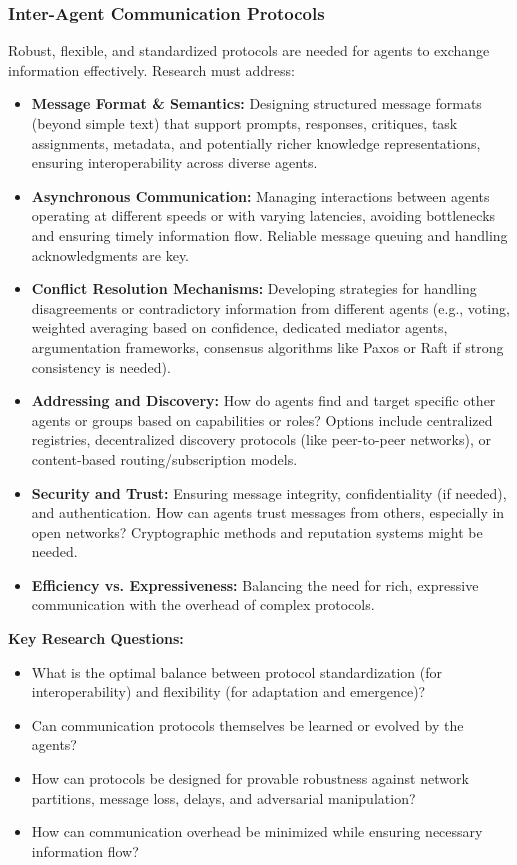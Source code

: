 \documentclass[12pt]{amsart}
\begin{document}
\subsubsection{Inter-Agent Communication Protocols}
\label{subsubsec:protocols}
Robust, flexible, and standardized protocols are needed for agents to exchange information effectively. Research must address:
\begin{itemize}[leftmargin=*]
    \item \textbf{Message Format \& Semantics:} Designing structured message formats (beyond simple text) that support prompts, responses, critiques, task assignments, metadata, and potentially richer knowledge representations, ensuring interoperability across diverse agents.
    \item \textbf{Asynchronous Communication:} Managing interactions between agents operating at different speeds or with varying latencies, avoiding bottlenecks and ensuring timely information flow. Reliable message queuing and handling acknowledgments are key.
    \item \textbf{Conflict Resolution Mechanisms:} Developing strategies for handling disagreements or contradictory information from different agents (e.g., voting, weighted averaging based on confidence, dedicated mediator agents, argumentation frameworks, consensus algorithms like Paxos or Raft if strong consistency is needed).
    \item \textbf{Addressing and Discovery:} How do agents find and target specific other agents or groups based on capabilities or roles? Options include centralized registries, decentralized discovery protocols (like peer-to-peer networks), or content-based routing/subscription models.
    \item \textbf{Security and Trust:} Ensuring message integrity, confidentiality (if needed), and authentication. How can agents trust messages from others, especially in open networks? Cryptographic methods and reputation systems might be needed.
    \item \textbf{Efficiency vs. Expressiveness:} Balancing the need for rich, expressive communication with the overhead of complex protocols.
\end{itemize}
\textbf{Key Research Questions:}
\begin{itemize}[leftmargin=*, label={--}]
    \item What is the optimal balance between protocol standardization (for interoperability) and flexibility (for adaptation and emergence)?
    \item Can communication protocols themselves be learned or evolved by the agents?
    \item How can protocols be designed for provable robustness against network partitions, message loss, delays, and adversarial manipulation?
    \item How can communication overhead be minimized while ensuring necessary information flow?
\end{itemize}
\end{document}
